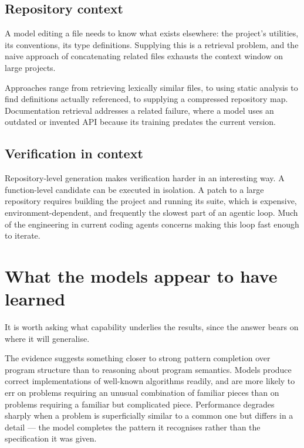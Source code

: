 \documentclass[11pt,a4paper]{article}
\begin{document}
\subsection{Repository context}

A model editing a file needs to know what exists elsewhere: the project's
utilities, its conventions, its type definitions. Supplying this is a
retrieval problem, and the naive approach of concatenating related files
exhausts the context window on large projects.

Approaches range from retrieving lexically similar files, to using static
analysis to find definitions actually referenced, to supplying a compressed
repository map. Documentation retrieval \cite{zhou2023} addresses a related
failure, where a model uses an outdated or invented API because its training
predates the current version.

\subsection{Verification in context}

Repository-level generation makes verification harder in an interesting way. A
function-level candidate can be executed in isolation. A patch to a large
repository requires building the project and running its suite, which is
expensive, environment-dependent, and frequently the slowest part of an agentic
loop. Much of the engineering in current coding agents concerns making this
loop fast enough to iterate.

\section{What the models appear to have learned}
\label{sec:learned}

It is worth asking what capability underlies the results, since the answer
bears on where it will generalise.

The evidence suggests something closer to strong pattern completion over
program structure than to reasoning about program semantics. Models produce
correct implementations of well-known algorithms readily, and are more likely
to err on problems requiring an unusual combination of familiar pieces than on
problems requiring a familiar but complicated piece. Performance degrades
sharply when a problem is superficially similar to a common one but differs in
a detail --- the model completes the pattern it recognises rather than the
specification it was given.
\end{document}
